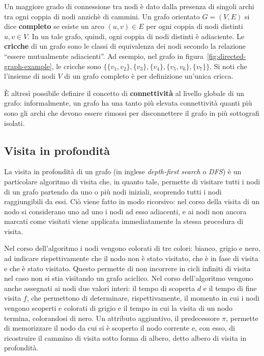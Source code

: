Un maggiore grado di connessione tra nodi \`e dato dalla presenza di singoli archi tra ogni coppia di nodi anzich\`e
di cammini. \newline
Un grafo orientato $G = (V, E)$ si dice \textbf{completo} se esiste un arco $(u, v) \in E$ per ogni coppia di nodi
distinti $u, v \in V$.
In un tale grafo, quindi, ogni coppia di nodi distinti \`e adiaciente. \newline
Le \textbf{cricche} di un grafo sono le classi di equivalenza dei nodi secondo la relazione
``essere mutualmente adiacienti''.
Ad esempio, nel grafo in figura~\ref{fig:directed-graph-example}, le cricche sono
$\{\{v_1, v_2\}, \{v_3\}, \{v_4\}, \{v_5, v_6\}, \{v_7\}\}$. \newline
Si noti che l'insieme di nodi $V$ di un grafo completo \`e per definizione un'unica cricca. \newline

\`E altresì possibile definire il concetto di \textbf{connettività} al livello globale di un grafo: informalmente,
un grafo ha una tanto più elevata connettività quanti più sono gli archi che devono essere rimossi per disconnettere
il grafo in più sottografi isolati.

\subsection{Visita in profondit\`a}
La visita in profondit\`a di un grafo (in inglese \textit{depth-first search} o \textit{DFS}) \`e un particolare
algoritmo di visita che, in quanto tale, permette di visitare tutti i nodi di un grafo partendo da uno o più nodi
iniziali, scoprendo tutti i nodi raggiungibili da essi.
Ci\`o viene fatto in modo ricorsivo: nel corso della visita di un nodo si considerano uno ad uno i nodi ad esso
adiacenti, e ai nodi non ancora marcati come visitati viene applicata immediatamente la stessa procedura di visita.
\newpage




Nel corso dell'algoritmo i nodi vengono colorati di tre colori: bianco, grigio e nero, ad indicare rispettivamente
che il nodo non \`e stato visitato, che \`e in fase di visita e che \`e stato visitato.
Questo permette di non incorrere in cicli infiniti di visita nel caso non si stia visitando un grafo aciclico.
Nel corso dell'algoritmo vengono anche assegnati ai nodi due valori interi: il tempo di scoperta $d$ e il tempo di
fine visita $f$, che permettono di determinare, rispettivamente, il momento in cui i nodi vengono scoperti e colorati
di grigio e il tempo in cui la visita di un nodo termina, colorandosi di nero.
Un attributo aggiuntivo, il predecessore $\pi$, permette di memorizzare il nodo da cui si \`e scoperto il nodo
corrente e, con esso, di ricostruire il cammino di visita sotto forma di albero, detto albero di visita in profondit\`a.

